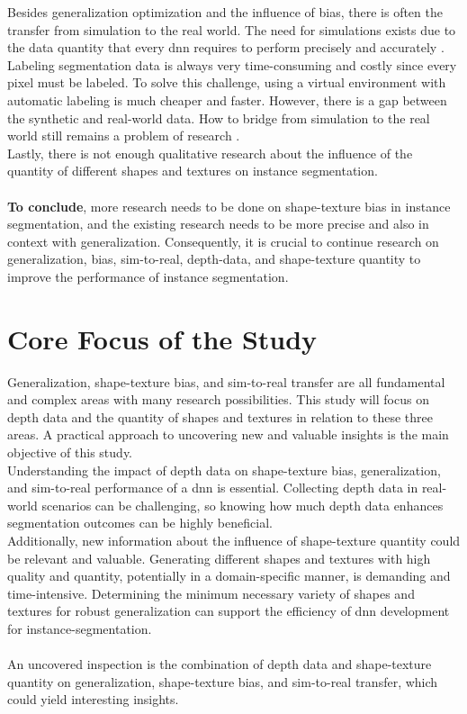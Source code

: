 		Besides generalization optimization and the influence of bias, there is often the transfer from simulation to the real world. The need for simulations exists due to the data quantity that every \ac{dnn} requires to perform precisely and accurately \cite {Uchida2016}\cite{Alzubaidi2021}\cite{Csurka2023}. Labeling segmentation data is always very time-consuming and costly since every pixel must be labeled. To solve this challenge, using a virtual environment with automatic labeling is much cheaper and faster. However, there is a gap between the synthetic and real-world data. How to bridge from simulation to the real world still remains a problem of research \cite{Doersch2019}.\\
		Lastly, there is not enough qualitative research about the influence of the quantity of different shapes and textures on instance segmentation.\\
		\\
		\textbf{To conclude}, more research needs to be done on shape-texture bias in instance segmentation, and the existing research needs to be more precise and also in context with generalization. Consequently, it is crucial to continue research on generalization, bias, sim-to-real, depth-data, and shape-texture quantity to improve the performance of instance segmentation.
		
	
	
	\section{Core Focus of the Study}    %
	\label{sec:core-focus-of-the-study}
		Generalization, shape-texture bias, and sim-to-real transfer are all fundamental and complex areas with many research possibilities. This study will focus on depth data and the quantity of shapes and textures in relation to these three areas. A practical approach to uncovering new and valuable insights is the main objective of this study.\\
		Understanding the impact of depth data on shape-texture bias, generalization, and sim-to-real performance of a \ac{dnn} is essential. Collecting depth data in real-world scenarios can be challenging, so knowing how much depth data enhances segmentation outcomes can be highly beneficial.\\
		Additionally, new information about the influence of shape-texture quantity could be relevant and valuable. Generating different shapes and textures with high quality and quantity, potentially in a domain-specific manner, is demanding and time-intensive. Determining the minimum necessary variety of shapes and textures for robust generalization can support the efficiency of \ac{dnn} development for instance-segmentation.\\
		\\
		An uncovered inspection is the combination of depth data and shape-texture quantity on generalization, shape-texture bias, and sim-to-real transfer, which could yield interesting insights.
		
